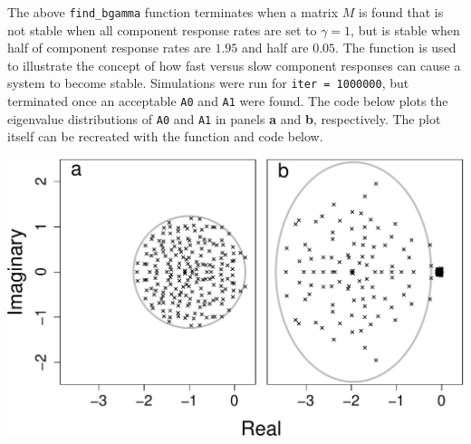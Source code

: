 \documentclass[]{article}
\newenvironment{Shaded}{\begin{snugshade}}{\end{snugshade}}
\newcommand{\KeywordTok}[1]{\textcolor[rgb]{0.13,0.29,0.53}{\textbf{{#1}}}}
\newcommand{\DataTypeTok}[1]{\textcolor[rgb]{0.13,0.29,0.53}{{#1}}}
\newcommand{\DecValTok}[1]{\textcolor[rgb]{0.00,0.00,0.81}{{#1}}}
\newcommand{\StringTok}[1]{\textcolor[rgb]{0.31,0.60,0.02}{{#1}}}
\newcommand{\NormalTok}[1]{{#1}}
\begin{document}
\begin{Shaded}
\end{Shaded}

The above \texttt{find\_bgamma} function terminates when a matrix \(M\)
is found that is not stable when all component response rates are set to
\(\gamma = 1\), but is stable when half of component response rates are
\(1.95\) and half are \(0.05\). The function is used to illustrate the
concept of how fast versus slow component responses can cause a system
to become stable. Simulations were run for \texttt{iter\ =\ 1000000},
but terminated once an acceptable \texttt{A0} and \texttt{A1} were
found. The code below plots the eigenvalue distributions of \texttt{A0}
and \texttt{A1} in panels \textbf{a} and \textbf{b}, respectively. The
plot itself can be recreated with the function and code below.

\includegraphics{SI_files/figure-latex/unnamed-chunk-5-1.pdf}
\end{document}
